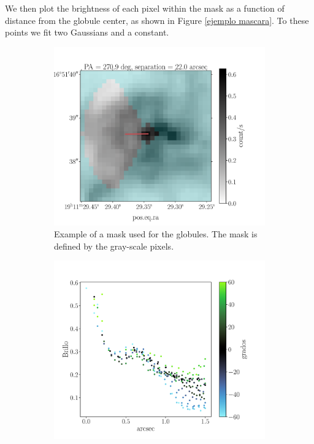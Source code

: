 \documentclass{book}
\begin{document}
We then plot the brightness of each pixel within the mask as a
function of distance from the globule center, as shown in Figure
\ref{ejemplo mascara}. To these points we fit two Gaussians and a
constant.

\begin{figure}[htb]
  \begin{subfigure}[b]{0.5\textwidth}
    \includegraphics[width=\textwidth, height=0.9\textwidth]{Nuevas imagenes finales/F_4_1_A.pdf}
    \caption{Example of a mask used for the globules. The mask is
      defined by the gray-scale pixels.}
    \label{fig:f1}
  \end{subfigure}
  \hfill
  \begin{subfigure}[b]{0.5\textwidth}
    \includegraphics[width=\textwidth, height=0.9\textwidth]{Nuevas imagenes finales/F_4_1_B.pdf}

\end{subfigure}
\end{figure}
\end{document}
